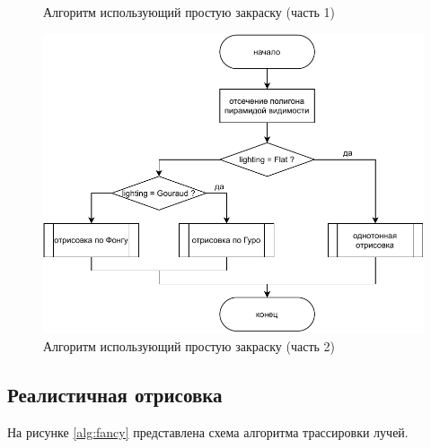 \begin{figure}
	\caption{Алгоритм использующий простую закраску (часть 1)}
	\label{alg:fast:1}
\end{figure}

\begin{figure}
	\centering
	\includegraphics[width=\linewidth,height=0.85\textheight,keepaspectratio]{diagrams/draw-face.pdf}
	\caption{Алгоритм использующий простую закраску (часть 2)}
	\label{alg:fast:2}
\end{figure}

\clearpage

\subsection{Реалистичная отрисовка}

На рисунке \ref{alg:fancy} представлена схема алгоритма трассировки лучей.

